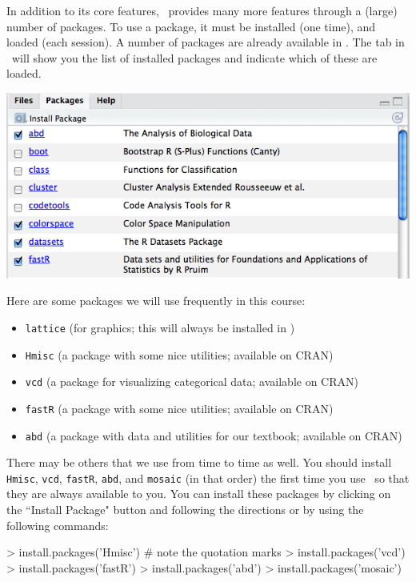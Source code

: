 In addition to its core features, \R\ provides many more features through a (large) number 
of packages.  To use a package, it must be installed (one time), and loaded (each session).
A number of packages are already available in \Rstudio.  
The  tab in \Rstudio\ will show you the list of installed packages and indicate
which of these are loaded.

\begin{center}
\includegraphics[width=.55\textwidth]{images/RStudio-packages}
\end{center}


Here are some packages we will use frequently in this course:
\begin{itemize}
\item \verb!lattice!  (for graphics; this will always be installed in \R)
\item \verb!Hmisc!    (a package with some nice utilities; available on CRAN)
\item \verb!vcd!      (a package for visualizing categorical data; available on CRAN)
\item \verb!fastR!    (a package with some nice utilities; available on CRAN)
\item \verb!abd!      (a package with data and utilities for our textbook; available on CRAN)
\end{itemize}
There may be others that we use from time to time as well.  You should install
\verb!Hmisc!, \verb!vcd!, \verb!fastR!, \verb!abd!, and \verb!mosaic! 
(in that order) the first time you use \R\ 
so that they are always available to you.
You can install these packages 
by clicking on the ``Install Package" button and following the directions
or by using the following commands:

\begin{Schunk}
\begin{Sinput}
> install.packages('Hmisc')           # note the quotation marks 
> install.packages('vcd')
> install.packages('fastR')
> install.packages('abd')
> install.packages('mosaic')
\end{Sinput}
\end{Schunk}


